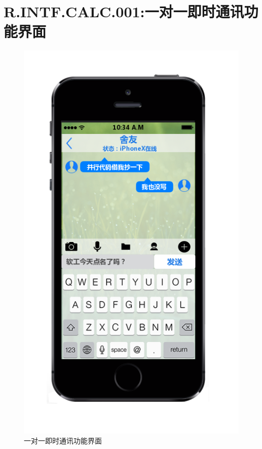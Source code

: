    \section{R.INTF.CALC.001:一对一即时通讯功能界面}
    \begin{figure}[h]
        \centering
        \includegraphics[scale=0.6]{OutlineDesign/figures/一对一即时通讯功能界面.png}
        \caption{一对一即时通讯功能界面}
        \label{fig:server_flow}
    \end{figure}
    \newpage
